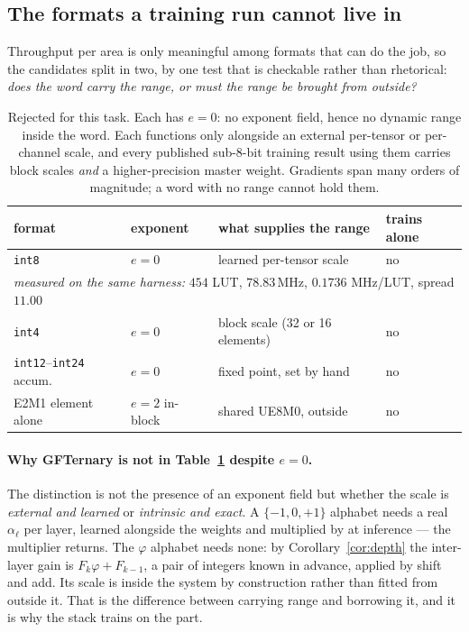 \documentclass[11pt]{article}
\theoremstyle{definition}
\begin{document}
\subsection{The formats a training run cannot live in}
\label{sec:untrainable}

Throughput per area is only meaningful among formats that can do the job, so the
candidates split in two, by one test that is checkable rather than rhetorical:
\emph{does the word carry the range, or must the range be brought from outside?}

\begin{table}[t]\centering
\caption{Rejected for this task. Each has $e=0$: no exponent field, hence no
dynamic range inside the word. Each functions only alongside an external
per-tensor or per-channel scale, and every published sub-8-bit training result
using them carries block scales \emph{and} a higher-precision master weight.
Gradients span many orders of magnitude; a word with no range cannot hold them.}
\label{tab:rejected}
\begin{tabular}{llll}
\toprule
format & exponent & what supplies the range & trains alone \\
\midrule
\texttt{int8} & $e=0$ & learned per-tensor scale & no \\
\multicolumn{4}{l}{\quad\emph{measured on the same harness:} $454$ LUT, $78.83$\,MHz, $0.1736$ MHz/LUT, spread $11.00$} \\
\texttt{int4} & $e=0$ & block scale (32 or 16 elements) & no \\
\texttt{int12}--\texttt{int24} accum. & $e=0$ & fixed point, set by hand & no \\
E2M1 element alone & $e=2$ in-block & shared UE8M0, outside & no \\
\bottomrule
\end{tabular}
\end{table}

\paragraph{Why GFTernary is not in Table~\ref{tab:rejected} despite $e=0$.}
The distinction is not the presence of an exponent field but whether the scale is
\emph{external and learned} or \emph{intrinsic and exact}. A $\{-1,0,+1\}$
alphabet needs a real $\alpha_\ell$ per layer, learned alongside the weights and
multiplied by at inference --- the multiplier returns. The $\varphi$ alphabet
needs none: by Corollary~\ref{cor:depth} the inter-layer gain is
$F_k\varphi + F_{k-1}$, a pair of integers known in advance, applied by shift and
add. Its scale is inside the system by construction rather than fitted from
outside it. That is the difference between carrying range and borrowing it, and
it is why the stack trains on the part.
\end{document}
